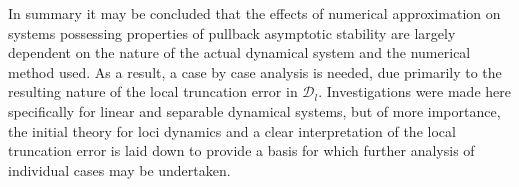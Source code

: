 In summary it may be concluded that the effects of numerical
approximation on systems possessing properties of pullback
asymptotic stability are largely dependent on the nature of the
actual dynamical system and the numerical method used. As a
result, a case by case analysis is needed, due primarily to the
resulting nature of the local truncation error in $\mathcal{D}_l$.
Investigations were made here specifically for linear and
separable dynamical systems, but of more importance, the initial
theory for loci dynamics and a clear interpretation of the local
truncation error is laid down to provide a basis for which further
analysis of individual cases may be undertaken.




\endinput
